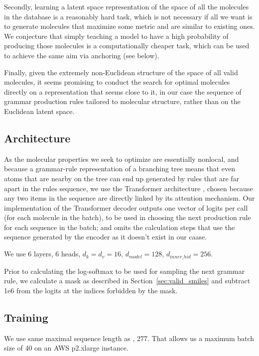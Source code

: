 \documentclass{article}
\begin{document}
Secondly, learning a latent space representation of the space of all the molecules in the database is a reasonably hard task, which is not necessary if all we want is to generate molecules that maximize some metric and are similar to existing ones. We conjecture that simply teaching a model to have a high probability of producing those molecules is a computationally cheaper task, which can be used to achieve the same aim via anchoring (see below).

Finally, given the extremely non-Euclidean structure of the space of all valid molecules, it seems promising to conduct the search for optimal molecules directly on a representation that seems close to it, in our case the sequence of grammar production rules tailored to molecular structure, rather than on the Euclidean latent space. 
\subsection{Architecture}
As the molecular properties we seek to optimize are essentially nonlocal, and because a grammar-rule representation of a branching tree means that even atoms that are nearby on the tree can end up generated by rules that are far apart in the rules sequence, we use the Transformer architecture \cite{Transformer17}, chosen because any two items in the sequence are directly linked by its attention mechanism. Our implementation of the Transformer decoder outputs one vector of logits per call (for each molecule in the batch), to be used in choosing the next production rule for each sequence in the batch; and omits the calculation steps that use the sequence generated by the encoder as it doesn't exist in our caase.

We use 6 layers, 6 heads, $d_k=d_v=16$, $d_{model}=128$, $d_{inner\_hid}=256$.

Prior to calculating the log-softmax to be used for sampling the next grammar rule, we calculate a mask as described in Section~\ref{sec:valid_smiles} and subtract 1e6 from the logits at the indices forbidden by the mask. 
\subsection{Training}\label{sec:training}
We use same maximal sequence length as \cite{kusner17}, 277.
That allows us a maximum batch size of 40 on an AWS p2.xlarge instance. 
\end{document}
